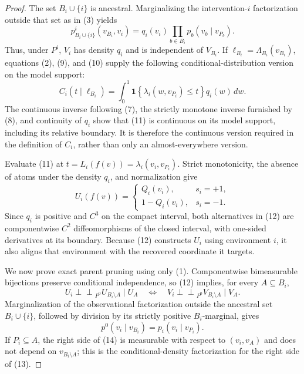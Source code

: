 \documentclass{article}
\begin{document}
\begin{proof}
The set \(B_i\cup\{i\}\) is ancestral.  Marginalizing the intervention-\(i\) factorization outside that set as in (3) yields
\[
 p^i_{B_i\cup\{i\}}(v_{B_i},v_i)
 =q_i(v_i)\prod_{b\in B_i}p_b(v_b\mid v_{P_b}).
\tag{10}
\]
Thus, under \(P^i\), \(V_i\) has density \(q_i\) and is independent of \(V_{B_i}\).  If \(\ell_{B_i}=\Lambda_{B_i}(v_{B_i})\), equations (2), (9), and (10) supply the following conditional-distribution version on the model support:
\[
 C_i(t\mid\ell_{B_i})
 =\int_0^1
 \mathbf 1\!\left\{\lambda_i(w,v_{P_i})\le t\right\}q_i(w)\,dw.
\tag{11}
\]
The continuous inverse following (7), the strictly monotone inverse furnished by (8), and continuity of \(q_i\) show that (11) is continuous on its model support, including its relative boundary.  It is therefore the continuous version required in the definition of \(C_i\), rather than only an almost-everywhere version.

Evaluate (11) at \(t=L_i(f(v))=\lambda_i(v_i,v_{P_i})\).  Strict monotonicity, the absence of atoms under the density \(q_i\), and normalization give
\[
 U_i(f(v))=
 \begin{cases}
 Q_i(v_i),&s_i=+1,\\[3pt]
 1-Q_i(v_i),&s_i=-1.
 \end{cases}
\tag{12}
\]
Since \(q_i\) is positive and \(C^3\) on the compact interval, both alternatives in (12) are componentwise \(C^2\) diffeomorphisms of the closed interval, with one-sided derivatives at its boundary.  Because (12) constructs \(U_i\) using environment \(i\), it also aligns that environment with the recovered coordinate it targets.

We now prove exact parent pruning using only (1).  Componentwise bimeasurable bijections preserve conditional independence, so (12) implies, for every \(A\subseteq B_i\),
\[
 U_i\mathbin{\perp\!\!\!\perp}_{P^0}U_{B_i\setminus A}\mid U_A
 \quad\Longleftrightarrow\quad
 V_i\mathbin{\perp\!\!\!\perp}_{P^0}V_{B_i\setminus A}\mid V_A.
\tag{13}
\]
Marginalization of the observational factorization outside the ancestral set \(B_i\cup\{i\}\), followed by division by its strictly positive \(B_i\)-marginal, gives
\[
 p^0(v_i\mid v_{B_i})=p_i(v_i\mid v_{P_i}).
\tag{14}
\]
If \(P_i\subseteq A\), the right side of (14) is measurable with respect to \((v_i,v_A)\) and does not depend on \(v_{B_i\setminus A}\); this is the conditional-density factorization for the right side of (13).


\end{proof}
\end{document}
